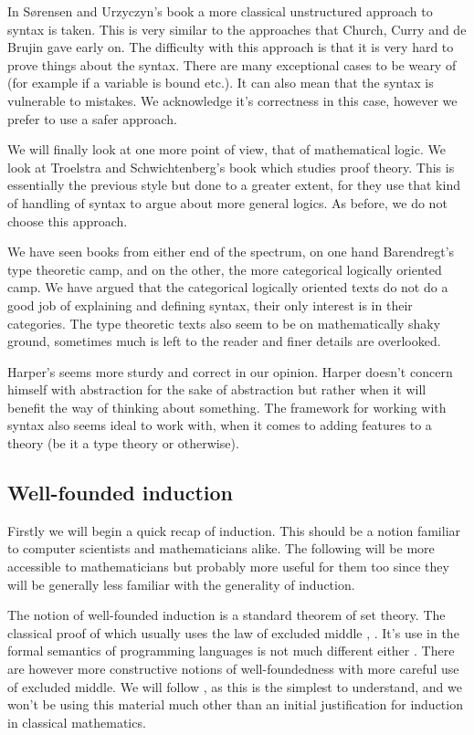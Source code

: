 In S{\o}rensen and Urzyczyn's book \cite{Sorensen:2006:LCI:1197021} a more classical unstructured approach to syntax is taken. This is very similar to the approaches that Church, Curry and de Brujin gave early on. The difficulty with this approach is that it is very hard to prove things about the syntax. There are many exceptional cases to be weary of (for example if a variable is bound etc.). It can also mean that the syntax is vulnerable to mistakes. We acknowledge it's correctness in this case, however we prefer to use a safer approach.

We will finally look at one more point of view, that of mathematical logic. We look at Troelstra and Schwichtenberg's book \cite{troelstra_schwichtenberg_2000} which studies proof theory. This is essentially the previous style but done to a greater extent, for they use that kind of handling of syntax to argue about more general logics. As before, we do not choose this approach.

We have seen books from either end of the spectrum, on one hand Barendregt's type theoretic camp, and on the other, the more categorical logically oriented camp. We have argued that the categorical logically oriented texts do not do a good job of explaining and defining syntax, their only interest is in their categories. The type theoretic texts also seem to be on mathematically shaky ground, sometimes much is left to the reader and finer details are overlooked.

Harper's seems more sturdy and correct in our opinion. Harper doesn't concern himself with abstraction for the sake of abstraction but rather when it will benefit the way of thinking about something. The framework for working with syntax also seems ideal to work with, when it comes to adding features to a theory (be it a type theory or otherwise).

\subsection{Well-founded induction}

Firstly we will begin a quick recap of induction. This should be a notion familiar to computer scientists and mathematicians alike. The following will be more accessible to mathematicians but probably more useful for them too since they will be generally less familiar with the generality of induction.


The notion of well-founded induction is a standard theorem of set theory. The classical proof of which usually uses the law of excluded middle \cite[p. 62]{johnstone1987notes}, \cite[Ch. 7]{barwise1982handbook}. It's use in the formal semantics of programming languages is not much different either \cite[Ch. 3]{winskel1993formal}. There are however more constructive notions of well-foundedness \cite[\S 8]{2018arXiv180805204S} with more careful use of excluded middle. We will follow \cite{10.2307/2275781}, as this is the simplest to understand, and we won't be using this material much other than an initial justification for induction in classical mathematics.

